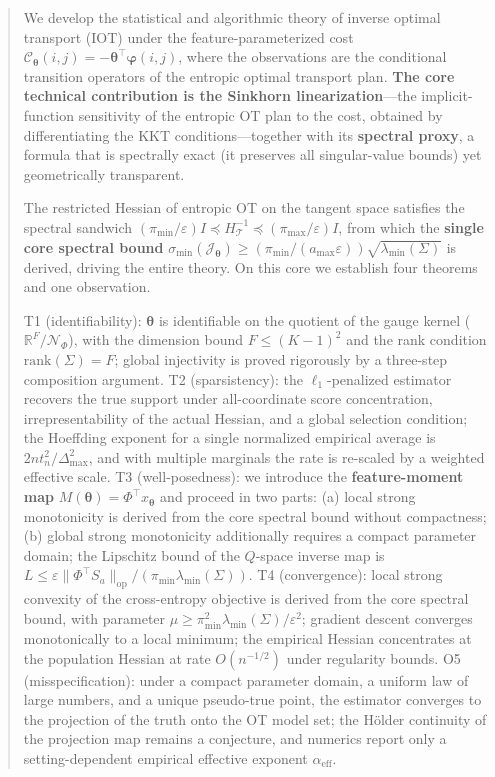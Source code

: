 \documentclass[11pt,a4paper]{article}
\theoremstyle{remark}
\begin{document}
\begin{abstract}
We develop the statistical and algorithmic theory of inverse optimal transport (IOT) under
the feature-parameterized cost
$\mathcal{C}_{\bm{\theta}}(i,j)=-\bm{\theta}^{\top}\bm{\varphi}(i,j)$, where the observations
are the conditional transition operators of the entropic optimal transport plan.
\textbf{The core technical contribution is the Sinkhorn linearization}---the
implicit-function sensitivity of the entropic OT plan to the cost, obtained by
differentiating the KKT conditions---together with its \textbf{spectral proxy}, a formula
that is spectrally exact (it preserves all singular-value bounds) yet geometrically
transparent.

The restricted Hessian of entropic OT on the tangent space satisfies the spectral sandwich
$(\pi_{\min}/\varepsilon)I\preceq H_{\mathcal{T}}^{-1}\preceq(\pi_{\max}/\varepsilon)I$,
from which the \textbf{single core spectral bound}
$\sigma_{\min}(\mathcal{J}_{\bm{\theta}})\ge(\pi_{\min}/(a_{\max}\varepsilon))\sqrt{\lambda_{\min}(\Sigma)}$
is derived, driving the entire theory. On this core we establish four theorems and one
observation.

T1 (identifiability): $\bm{\theta}$ is identifiable on the quotient of the gauge kernel
($\mathbb{R}^F/\mathcal{N}_\Phi$), with the dimension bound $F\le(K-1)^2$ and the rank
condition $\mathrm{rank}(\Sigma)=F$; global injectivity is proved rigorously by a three-step
composition argument.
T2 (sparsistency): the $\ell_1$-penalized estimator recovers the true support under
all-coordinate score concentration, irrepresentability of the actual Hessian, and a global
selection condition; the Hoeffding exponent for a single normalized empirical average is
$2nt_n^2/\Delta_{\max}^2$, and with multiple marginals the rate is re-scaled by a weighted
effective scale.
T3 (well-posedness): we introduce the \textbf{feature-moment map}
$M(\bm{\theta})=\Phi^{\top}x_{\bm{\theta}}$ and proceed in two parts: (a) local strong
monotonicity is derived from the core spectral bound without compactness; (b) global strong
monotonicity additionally requires a compact parameter domain; the Lipschitz bound of the
$Q$-space inverse map is
$L\le\varepsilon\|\Phi^{\top}S_a\|_{\mathrm{op}}/(\pi_{\min}\lambda_{\min}(\Sigma))$.
T4 (convergence): local strong convexity of the cross-entropy objective is derived from the
core spectral bound, with parameter $\mu\ge\pi_{\min}^2\lambda_{\min}(\Sigma)/\varepsilon^2$;
gradient descent converges monotonically to a local minimum; the empirical Hessian
concentrates at the population Hessian at rate $O(n^{-1/2})$ under regularity bounds.
O5 (misspecification): under a compact parameter domain, a uniform law of large numbers, and
a unique pseudo-true point, the estimator converges to the projection of the truth onto the
OT model set; the H\"older continuity of the projection map remains a conjecture, and
numerics report only a setting-dependent empirical effective exponent $\alpha_{\mathrm{eff}}$.


\end{abstract}
\end{document}
